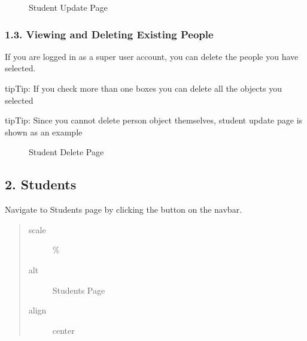 \documentclass[letterpaper,10pt,english]{sphinxmanual}
\begin{document}
\begin{figure}[htbp]
\centering
\capstart

\noindent{}
\caption{Student Update Page}\label{\detokenize{user/mehmet:id1}}\end{figure}


\subsubsection{1.3. Viewing and Deleting Existing People}
\label{\detokenize{user/mehmet:viewing-and-deleting-existing-people}}
If you are logged in as a super user account, you can delete the people you have selected.

\begin{sphinxadmonition}{tip}{Tip:}
If you check more than one boxes you can delete all the objects you selected
\end{sphinxadmonition}

\begin{sphinxadmonition}{tip}{Tip:}
Since you cannot delete person object themselves, student update page is shown as an example
\end{sphinxadmonition}

\begin{figure}[htbp]
\centering
\capstart

\noindent{}
\caption{Student Delete Page}\label{\detokenize{user/mehmet:id2}}\end{figure}


\subsection{2. Students}
\label{\detokenize{user/mehmet:students}}
Navigate to Students page by clicking the  button on the navbar.

\begin{figure}[htbp]
\centering

\noindent{}
\end{figure}
\begin{quote}\begin{description}
\item[{scale}]  \%

\item[{alt}] \leavevmode
Students Page

\item[{align}] \leavevmode
center

\end{description}\end{quote}
\end{document}
